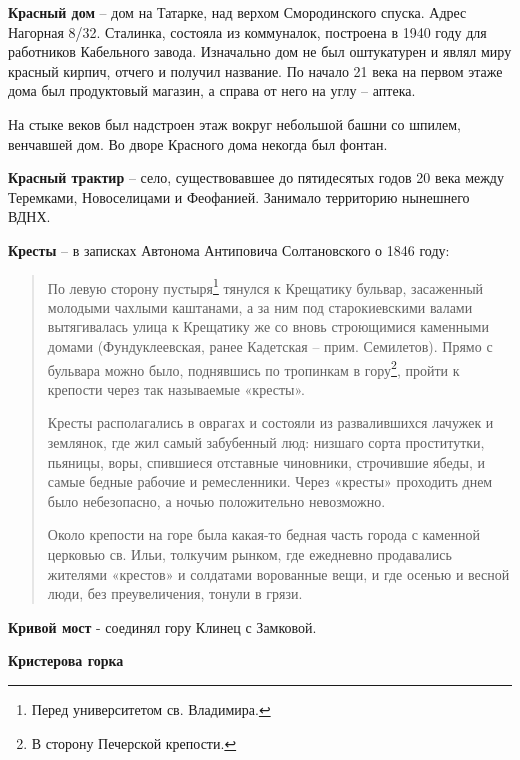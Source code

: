 \textbf{Красный дом} – дом на Татарке, над верхом Смородинского спуска. Адрес Нагорная 8/32. Сталинка, состояла из коммуналок, построена в 1940 году для работников Кабельного завода. Изначально дом не был оштукатурен и являл миру красный кирпич, отчего и получил название. По начало 21 века на первом этаже дома был продуктовый магазин, а справа от него на углу – аптека.

На стыке веков был надстроен этаж вокруг небольшой башни со шпилем, венчавшей дом. Во дворе Красного дома некогда был фонтан.\\    

\medskip

\textbf{Красный трактир} – село, существовавшее до пятидесятых годов 20 века между Теремками, Новоселицами и Феофанией. Занимало территорию нынешнего ВДНХ.\\


\medskip

\textbf{Кресты} – в записках Автонома Антиповича Солтановского о 1846 году:

\begin{quotation}
По левую сторону пустыря\footnote{Перед университетом св. Владимира.} тянулся к Крещатику бульвар, засаженный молодыми чахлыми каштанами, а за ним под старокиевскими валами вытягивалась улица к Крещатику же со вновь строющимися каменными домами (Фундуклеевская, ранее Кадетская – прим. Семилетов). Прямо с бульвара можно было, поднявшись по тропинкам в гору\footnote{В сторону Печерской крепости.}, пройти к крепости через так называемые «кресты».

Кресты располагались в оврагах и состояли из развалившихся лачужек и землянок, где жил самый забубенный люд: низшаго сорта проститутки, пьяницы, воры, спившиеся отставные чиновники, строчившие ябеды, и самые бедные рабочие и ремесленники. Через «кресты» проходить днем было небезопасно, а ночью положительно невозможно.

Около крепости на горе была какая-то бедная часть города с каменной церковью св. Ильи, толкучим рынком, где ежедневно продавались жителями «крестов» и солдатами ворованные вещи, и где осенью и весной люди, без преувеличения, тонули в грязи.
\end{quotation}


\medskip

\textbf{Кривой мост} - соединял гору Клинец с Замковой.\\

\medskip

\textbf{Кристерова горка} 

